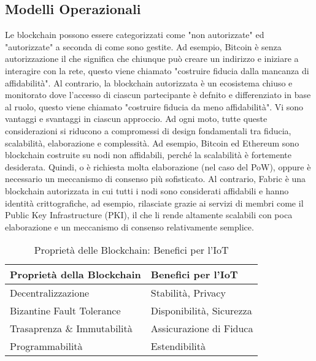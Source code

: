 \documentclass[a4paper,12pt,draft]{article}
\begin{document}
\subsection{Modelli Operazionali}
Le blockchain possono essere categorizzati come "non autorizzate" ed "autorizzate" a seconda di come sono gestite. Ad esempio, Bitcoin è senza autorizzazione il che significa che chiunque può creare un indirizzo e iniziare a interagire con la rete, questo viene chiamato "costruire fiducia dalla mancanza di affidabilità". Al contrario, la blockchain autorizzata è un ecosistema chiuso e monitorato dove l'accesso di ciascun partecipante è defnito e differenziato in base al ruolo, questo viene chiamato "costruire fiducia da meno affidabilità".
Vi sono vantaggi e svantaggi in ciascun approccio. Ad ogni moto, tutte queste considerazioni si riducono a compromessi di design fondamentali tra fiducia, scalabilità, elaborazione e complessità. Ad esempio, Bitcoin ed Ethereum sono blockchain costruite su nodi non affidabili, perché la scalabilità è fortemente desiderata. Quindi, o è richiesta molta elaborazione (nel caso del PoW), oppure è necessario un meccanismo di consenso più sofisticato. Al contrario, Fabric \cite{14} è una blockchain autorizzata in cui tutti i nodi sono considerati affidabili e hanno identità crittografiche, ad esempio, rilasciate grazie ai servizi di membri come il Public Key Infrastructure (PKI), il che li rende altamente scalabili con poca elaborazione e un meccanismo di consenso relativamente semplice.

\begin{table}[tp]%
	\caption{Proprietà delle Blockchain: Benefici per l'IoT}
	\label{table:BlockchainBenefits}\centering %
	\begin{tabular}{l|l}
		\hline
		Proprietà della Blockchain  & Benefici per l'IoT       \\
		\hline
		Decentralizzazione          & Stabilità, Privacy       \\
		Bizantine Fault Tolerance   & Disponibilità, Sicurezza \\
		Trasaprenza \& Immutabilità & Assicurazione di Fiduca  \\
		Programmabilità             & Estendibilità            \\
		\hline
	\end{tabular}
\end{table}

\pagebreak




\end{document}

